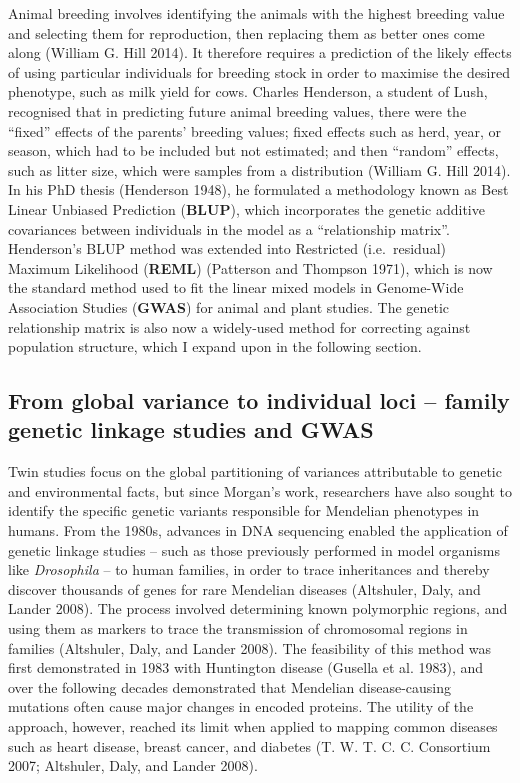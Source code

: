 \documentclass[
]{book}
\begin{document}
Animal breeding involves identifying the animals with the highest breeding value and selecting them for reproduction, then replacing them as better ones come along (William G. Hill 2014). It therefore requires a prediction of the likely effects of using particular individuals for breeding stock in order to maximise the desired phenotype, such as milk yield for cows. Charles Henderson, a student of Lush, recognised that in predicting future animal breeding values, there were the ``fixed'' effects of the parents' breeding values; fixed effects such as herd, year, or season, which had to be included but not estimated; and then ``random'' effects, such as litter size, which were samples from a distribution (William G. Hill 2014). In his PhD thesis (Henderson 1948), he formulated a methodology known as Best Linear Unbiased Prediction (\textbf{BLUP}), which incorporates the genetic additive covariances between individuals in the model as a ``relationship matrix''. Henderson's BLUP method was extended into Restricted (i.e.~residual) Maximum Likelihood (\textbf{REML}) (Patterson and Thompson 1971), which is now the standard method used to fit the linear mixed models in Genome-Wide Association Studies (\textbf{GWAS}) for animal and plant studies. The genetic relationship matrix is also now a widely-used method for correcting against population structure, which I expand upon in the following section.

\hypertarget{GWAS}{%
\subsection{From global variance to individual loci -- family genetic linkage studies and GWAS}\label{GWAS}}

Twin studies focus on the global partitioning of variances attributable to genetic and environmental facts, but since Morgan's work, researchers have also sought to identify the specific genetic variants responsible for Mendelian phenotypes in humans. From the 1980s, advances in DNA sequencing enabled the application of genetic linkage studies -- such as those previously performed in model organisms like \emph{Drosophila} -- to human families, in order to trace inheritances and thereby discover thousands of genes for rare Mendelian diseases (Altshuler, Daly, and Lander 2008). The process involved determining known polymorphic regions, and using them as markers to trace the transmission of chromosomal regions in families (Altshuler, Daly, and Lander 2008). The feasibility of this method was first demonstrated in 1983 with Huntington disease (Gusella et al. 1983), and over the following decades demonstrated that Mendelian disease-causing mutations often cause major changes in encoded proteins. The utility of the approach, however, reached its limit when applied to mapping common diseases such as heart disease, breast cancer, and diabetes (T. W. T. C. C. Consortium 2007; Altshuler, Daly, and Lander 2008).
\end{document}
